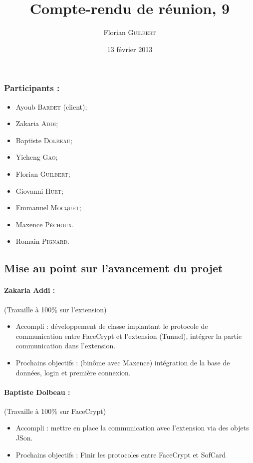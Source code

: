 \documentclass[a4paper,10pt]{article}
\author{Florian \textsc{Guilbert}}
\title{Compte-rendu de réunion, 9}
\date{13 février 2013}
\begin{document}
\maketitle

\subsubsection*{Participants : }
\begin{itemize}
    \item Ayoub \textsc{Bardet} (client);
    \item Zakaria \textsc{Addi};
    \item Baptiste \textsc{Dolbeau};
    \item Yicheng \textsc{Gao};
    \item Florian \textsc{Guilbert};
    \item Giovanni \textsc{Huet};
    \item Emmanuel \textsc{Mocquet};
    \item Maxence  \textsc{Péchoux}.
    \item Romain \textsc{Pignard}.
\end{itemize}

\subsection*{Mise au point sur l'avancement du projet}

\paragraph{Zakaria Addi :} (Travaille à 100\% sur l'extension)\\
\begin{itemize}
    \item Accompli : développement de classe implantant le protocole
        de communication entre FaceCrypt et l'extension (Tunnel), intégrer la
        partie communication dans l'extension.
    \item Prochains objectifs : (binôme avec Maxence) intégration de la 
    base de données, login et première connexion.
\end{itemize}

\paragraph{Baptiste Dolbeau :} (Travaille à 100\% sur FaceCrypt)
\begin{itemize}
\item Accompli : mettre en place la communication avec l'extension via des 
    objets JSon. 
\item Prochains objectifs : Finir les protocoles entre FaceCrypt et SofCard
\end{itemize}
\end{document}
